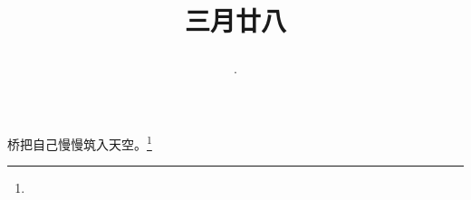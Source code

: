 \title{\date[d=6,m=5,y=2024][year:cn-y,年,month:cn,day:cn,日,·,weekday]·三月廿八 }
桥把自己慢慢筑入天空。\footnote{ }

